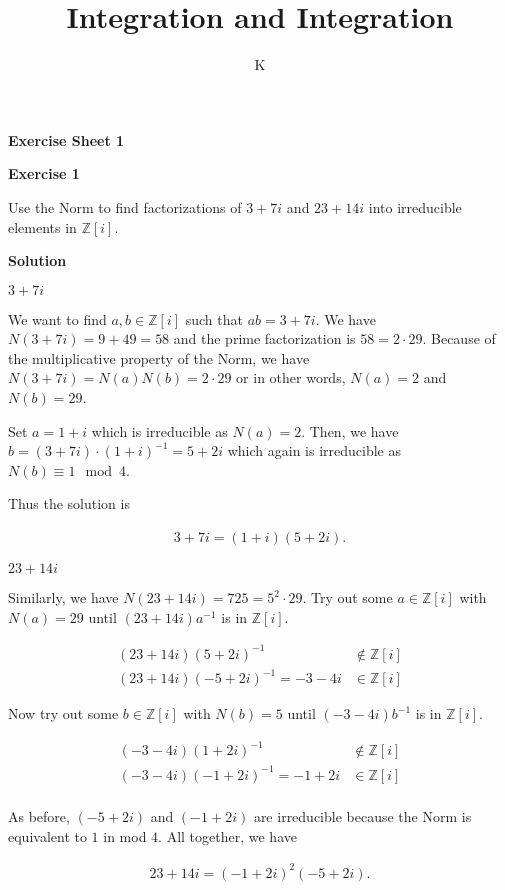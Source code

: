 \documentclass[a4paper]{article}
\title{Integration and Integration}
\author{K}
\theoremstyle{definition}
\begin{document}
\begin{center}
    \noindent\textbf{Exercise Sheet 1}
\end{center}
\noindent\textbf{Exercise 1}

Use the Norm to find factorizations of \(3 + 7i\) and \(23 + 14i\) into irreducible elements in \(\mathbb{Z}[i]\).

\noindent\textbf{Solution}

\noindent\underline{\(3 + 7i\)}

We want to find \(a, b \in \mathbb{Z}[i]\) such that \(ab = 3 + 7i\). We have \(N(3 + 7i) = 9 + 49 = 58\) and the prime factorization is \(58 = 2 \cdot 29\). Because of the multiplicative property of the Norm, we have \(N(3 + 7i) = N(a)N(b) = 2 \cdot 29\) or in other words, \(N(a) = 2\) and \(N(b) = 29\).

Set \(a = 1 + i\) which is irreducible as \(N(a) = 2\). Then, we have \(b = (3 + 7i) \cdot (1 + i)^{-1} = 5 + 2i\) which again is irreducible as \(N(b) \equiv 1 \mod{4}\).

Thus the solution is

\begin{align}
    3 + 7i = (1 + i) (5 + 2i) \text{.}
\end{align}

\noindent\underline{\(23 + 14i\)}

Similarly, we have \(N(23 + 14i) = 725 = 5^2 \cdot 29\). Try out some \(a \in \mathbb{Z}[i]\) with \(N(a) = 29\) until \((23 + 14i)a^{-1}\) is in \(\mathbb{Z}[i]\).

\begin{align}
    (23 + 14i)(5 + 2i)^{-1} &\notin \mathbb{Z}[i] \\
    (23 + 14i)(-5 + 2i)^{-1} = -3-4i &\in \mathbb{Z}[i]
\end{align}

Now try out some \(b \in \mathbb{Z}[i]\) with \(N(b) = 5\) until \((-3-4i)b^{-1}\) is in \(\mathbb{Z}[i]\).

\begin{align}
    (-3 -4i)(1 + 2i)^{-1} &\notin \mathbb{Z}[i] \\
    (-3 -4i)(-1 + 2i)^{-1} = -1 + 2i&\in \mathbb{Z}[i] \\
\end{align}

As before, \((-5 + 2i)\) and \((-1 + 2i)\) are irreducible because the Norm is equivalent to \(1\) in mod \(4\). All together, we have

\begin{align}
    23 + 14i = (-1 + 2i)^2 (-5 + 2i) \text{.}
\end{align}
\end{document}
